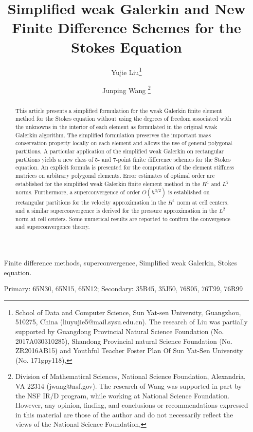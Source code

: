 \documentclass[final,leqno]{siamltex704}
\title{Simplified weak Galerkin and New Finite Difference Schemes for the Stokes Equation}
\author{Yujie Liu\thanks{School of Data and Computer Science, Sun Yat-sen University, Guangzhou, 510275, China (liuyujie5@mail.sysu.edu.cn). The research of Liu was partially supported by Guangdong Provincial Natural Science Foundation (No. 2017A030310285), Shandong Provincial natural Science Foundation (No. ZR2016AB15) and Youthful Teacher Foster Plan Of Sun Yat-Sen University (No. 171gpy118),} \and Junping Wang
\thanks{Division of Mathematical Sciences, National Science Foundation, Alexandria, VA 22314 (jwang@nsf.gov). The research of Wang was supported in part by the NSF IR/D program, while working at National Science Foundation. However, any opinion, finding, and conclusions or recommendations expressed in this material are those of the author and do not necessarily reflect the views of the
National Science Foundation,}
}
\begin{document}
\maketitle

\begin{abstract}
This article presents a simplified formulation for the weak Galerkin finite element method for the Stokes equation without using the degrees of freedom associated with the unknowns in the interior of each element as formulated in the original weak Galerkin algorithm. The simplified formulation preserves the important mass conservation property locally on each element and allows the use of general polygonal partitions. A particular application of the simplified weak Galerkin on rectangular partitions yields a new class of 5- and 7-point finite difference schemes for the Stokes equation. An explicit formula is presented for the computation of the element stiffness matrices on arbitrary polygonal elements. Error estimates of optimal order are established for the simplified weak Galerkin finite element method in the $H^1$ and $L^2$ norms. Furthermore, a superconvergence of order $O(h^{3/2})$ is established on rectangular partitions for the velocity approximation in the $H^1$ norm at cell centers, and a similar superconvergence is derived for the pressure approximation in the $L^2$ norm at cell centers. Some numerical results are reported to confirm the convergence and superconvergence theory.
\end{abstract}

\begin{keywords} Finite difference methods, superconvergence, Simplified weak Galerkin, Stokes equation.
\end{keywords}

\begin{AMS}
Primary: 65N30, 65N15, 65N12; Secondary: 35B45, 35J50, 76S05, 76T99, 76R99
\end{AMS}

\pagestyle{myheadings}

%
\end{document}
